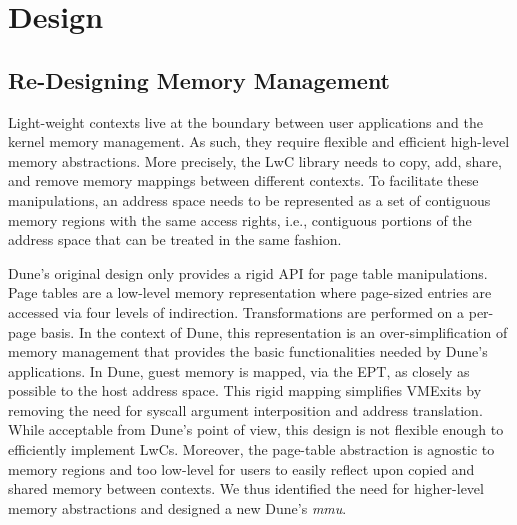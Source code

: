 \chapter{Design}

\section{Re-Designing Memory Management}
%
%
%

Light-weight contexts live at the boundary between user applications and the kernel memory management.
As such, they require flexible and efficient high-level memory abstractions.
More precisely, the LwC library needs to copy, add, share, and remove memory mappings between different contexts.
To facilitate these manipulations, an address space needs to be represented as a set of contiguous memory regions with the same access rights, i.e., contiguous portions of the address space that can be treated in the same fashion.

Dune's original design only provides a rigid API for page table manipulations.
Page tables are a low-level memory representation where page-sized entries are accessed via four levels of indirection.
Transformations are performed on a per-page basis.
In the context of Dune, this representation is an over-simplification of memory management that provides the basic functionalities needed by Dune's applications.
In Dune, guest memory is mapped, via the EPT, as closely as possible to the host address space.
This rigid mapping simplifies VMExits by removing the need for syscall argument interposition and address translation.
While acceptable from Dune's point of view, this design is not flexible enough to efficiently implement LwCs.
Moreover, the page-table abstraction is agnostic to memory regions and too low-level for users to easily reflect upon copied and shared memory between contexts.
We thus identified the need for higher-level memory abstractions and designed a new Dune's \textit{mmu}.

